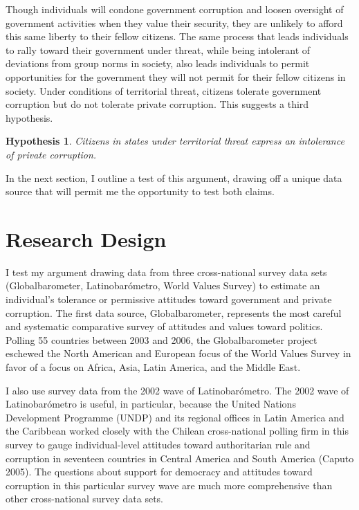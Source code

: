 \documentclass[11pt,]{article}
\newtheorem{hypothesis}{Hypothesis}
\begin{document}
Though individuals will condone government corruption and loosen
oversight of government activities when they value their security, they
are unlikely to afford this same liberty to their fellow citizens. The
same process that leads individuals to rally toward their government
under threat, while being intolerant of deviations from group norms in
society, also leads individuals to permit opportunities for the
government they will not permit for their fellow citizens in society.
Under conditions of territorial threat, citizens tolerate government
corruption but do not tolerate private corruption. This suggests a third
hypothesis.

\begin{hypothesis}
\begin{minipage}[t]{5.1 in}
Citizens in states under territorial threat express an intolerance of private corruption.
\end{minipage}
\end{hypothesis}

In the next section, I outline a test of this argument, drawing off a
unique data source that will permit me the opportunity to test both
claims.

\section{Research Design}\label{research-design}

I test my argument drawing data from three cross-national survey data
sets (Globalbarometer, Latinobarómetro, World Values Survey) to estimate
an individual's tolerance or permissive attitudes toward government and
private corruption. The first data source, Globalbarometer, represents
the most careful and systematic comparative survey of attitudes and
values toward politics. Polling 55 countries between 2003 and 2006, the
Globalbarometer project eschewed the North American and European focus
of the World Values Survey in favor of a focus on Africa, Asia, Latin
America, and the Middle East.

I also use survey data from the 2002 wave of Latinobarómetro. The 2002
wave of Latinobarómetro is useful, in particular, because the United
Nations Development Programme (UNDP) and its regional offices in Latin
America and the Caribbean worked closely with the Chilean cross-national
polling firm in this survey to gauge individual-level attitudes toward
authoritarian rule and corruption in seventeen countries in Central
America and South America (Caputo 2005). The questions about support for
democracy and attitudes toward corruption in this particular survey wave
are much more comprehensive than other cross-national survey data sets.
\end{document}
